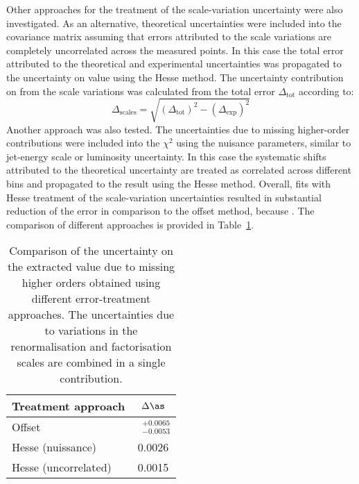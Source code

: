 Other approaches for the treatment of the scale-variation uncertainty were also investigated. As an alternative, theoretical uncertainties were included into the covariance matrix assuming that errors attributed to the scale variations are completely uncorrelated across the measured points. In this case the total error attributed to the theoretical and experimental uncertainties was propagated to the uncertainty on \asz value using the Hesse method. The uncertainty contribution on \as from the scale variations was calculated from the total error $\Delta_\text{tot}$ according to:
\begin{equation}
 \Delta_\text{scales} = \sqrt{\left(\Delta_\text{tot}\right)^2 - \left(\Delta_\text{exp}\right)^2}
 \label{eq:asuncscalecontrib}
\end{equation}
Another approach was also tested. The uncertainties due to missing higher-order contributions were included into the $\chi^2$ using the nuisance parameters, similar to jet-energy scale or luminosity uncertainty. In this case the systematic shifts attributed to the theoretical uncertainty are treated as correlated across different bins and propagated to the result using the Hesse method. Overall, fits with Hesse treatment of the scale-variation uncertainties resulted in substantial reduction of the \asz error in comparison to the offset method, because . The comparison of different approaches is provided in Table~\ref{tab:scaleuncvariants}.
\begin{table}[h]
\centering
\begin{tabular}{|l|c|}
 \hline
 Treatment approach & $\Delta\as$ \\
 \hline
 \hline
  Offset & $\phantom{x}^{+0.0065}_{-0.0053}$\\
  Hesse (nuissance) & 0.0026 \\
  Hesse (uncorrelated) & 0.0015 \\
 \hline
\end{tabular}
\caption{Comparison of the uncertainty on the extracted \asz value due to missing higher orders obtained using different error-treatment approaches. The uncertainties due to variations in the renormalisation and factorisation scales are combined in a single contribution.}
\label{tab:scaleuncvariants}
\end{table}

